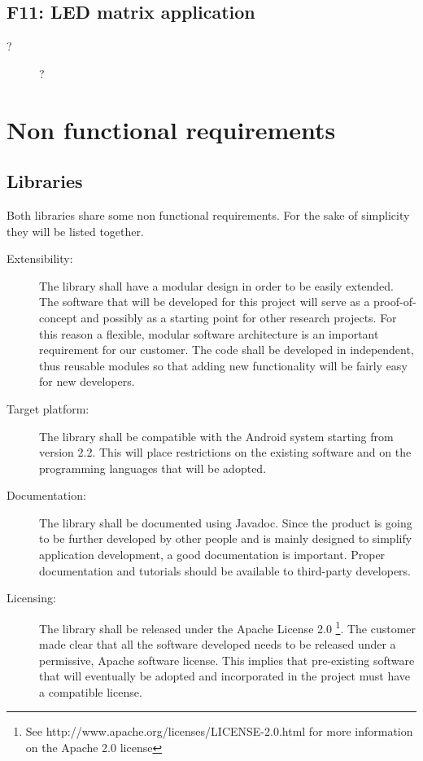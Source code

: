 \subsection{F11: LED matrix application}
\begin{description}
	\item[?] ?
\end{description}

\newpage

\section{Non functional requirements}

\subsection{Libraries}

Both libraries share some non functional requirements.
For the sake of simplicity they will be listed together.

\begin{description}
	\item[Extensibility:] The library shall have a modular design
	in order to be easily extended. The software that will be developed for
	this project will serve as a proof-of-concept and possibly as a starting
	point for other research projects. For this reason a flexible, modular
	software architecture is an important requirement for our customer. The code
	shall be developed in independent, thus reusable modules so that adding new
	functionality will be fairly easy for new developers.
	\item[Target platform:] The library shall be compatible with the Android
	system starting from version 2.2. This will place restrictions on the
	existing software and on the programming languages that will be adopted.
	\item[Documentation:] The library shall be documented using Javadoc.
	Since the product is going to be further developed by other people and is
	mainly designed to simplify application development, a good documentation is
	important. Proper documentation and tutorials should be available to
	third-party developers.
	\item[Licensing:] The library shall be released under the Apache License 2.0
	\footnote{See http://www.apache.org/licenses/LICENSE-2.0.html for more
	information on the Apache 2.0 license}. The customer made clear that all the
	software developed needs to be released under a permissive, Apache software
	license. This implies that pre-existing software that will eventually be
	adopted and incorporated in the project must have a compatible license.
\end{description}


